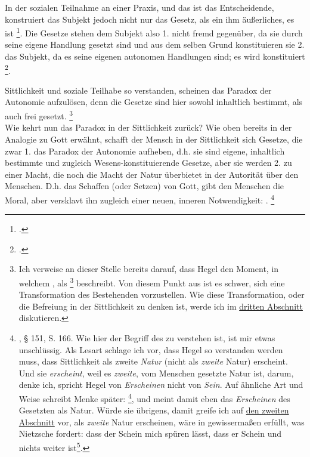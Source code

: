 \documentclass[12pt, a4paper, openany]{report}
\begin{document}
In der sozialen Teilnahme an einer Praxis, und das ist das Entscheidende, konstruiert das Subjekt jedoch nicht nur das Gesetz, als ein ihm äußerliches, es ist \footcite[][§ 147, S. 162.]{hegel_grundlinien_2017}.
Die Gesetze stehen dem Subjekt also 1. nicht fremd gegenüber, da sie durch seine eigene Handlung gesetzt sind und aus dem selben Grund konstituieren sie 2. das Subjekt, da es seine eigenen autonomen Handlungen sind;
es wird konstituiert \footcite[][30]{menke_autonomie_2018}.

Sittlichkeit und soziale Teilhabe so verstanden, scheinen das Paradox der Autonomie aufzulösen, denn die Gesetze sind hier sowohl inhaltlich bestimmt, als auch frei gesetzt.%
\footnote{
    Ich verweise an dieser Stelle bereits darauf, dass Hegel den Moment, in welchem , als \footcite[][§ 147 A, S. 163.]{hegel_grundlinien_2017} beschreibt. 
    Von diesem Punkt aus ist es schwer, sich eine Transformation des Bestehenden vorzustellen.
    Wie diese Transformation, oder die Befreiung in der Sittlichkeit zu denken ist, werde ich im \hyperref[abschnitt_3]{dritten Abschnitt} diskutieren.
}\\

Wie kehrt nun das Paradox in der Sittlichkeit zurück? 
Wie oben bereits in der Analogie zu Gott erwähnt, schafft der Mensch in der Sittlichkeit sich Gesetze, die zwar 1. das Paradox der Autonomie aufheben, d.h. sie sind eigene, inhaltlich bestimmte und zugleich Wesens-konstituierende Gesetze, aber sie werden 2. zu einer Macht, die noch die Macht der Natur überbietet in der Autorität über den Menschen.
D.h. das Schaffen (oder Setzen) von Gott, gibt den Menschen die Moral, aber versklavt ihn zugleich einer neuen, inneren Notwendigkeit: .%
\footnote{\cite{hegel_grundlinien_2017}, § 151, S. 166.
    Wie hier der Begriff des  zu verstehen ist, ist mir etwas unschlüssig. 
    Als Lesart schlage ich vor, dass Hegel so verstanden werden muss, dass Sittlichkeit als zweite \emph{Natur} (nicht als \emph{zweite} Natur) erscheint. 
    Und sie \emph{erscheint}, weil es \emph{zweite}, vom Menschen gesetzte Natur ist, darum, denke ich, spricht Hegel von \emph{Erscheinen} nicht von \emph{Sein}.
    Auf ähnliche Art und Weise schreibt Menke später: \footcite[][142]{menke_autonomie_2018}, und meint damit eben das \emph{Erscheinen} des Gesetzten als Natur.
    Würde sie übrigens, damit greife ich auf \hyperref[abschnitt_2]{den zweiten Abschnitt} vor, als \emph{zweite} Natur erscheinen, wäre in gewissermaßen erfüllt, was Nietzsche fordert: 
    dass der Schein mich spüren lässt, dass er Schein und nichts weiter ist\footcite[Vlg.][416.]{nietzsche_morgenrote_1999}.
}
\end{document}
